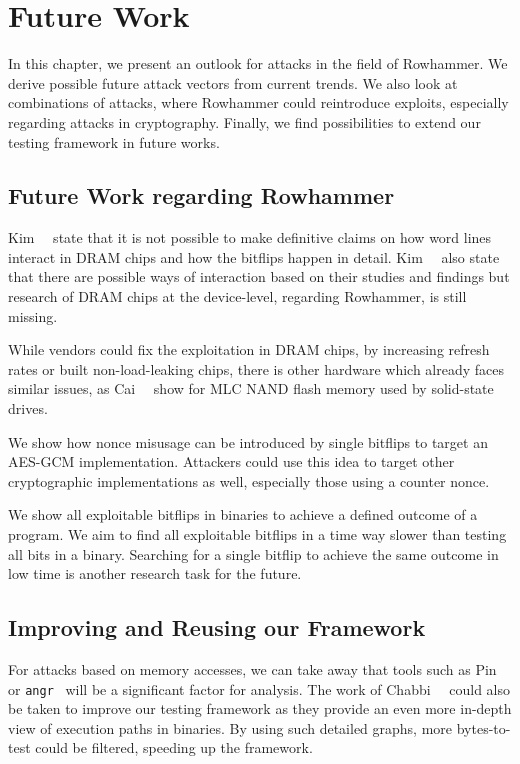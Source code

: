 \chapter{Future Work}\label{sec:futurework}

In this chapter, we present an outlook for attacks in the field of Rowhammer. We
derive possible future attack vectors from current trends. We also look at
combinations of attacks, where Rowhammer could reintroduce exploits, especially
regarding attacks in cryptography. Finally, we find possibilities to extend our
testing framework in future works.

\section{Future Work regarding Rowhammer}

Kim~\etal~\cite{rowhammergeneral} state that it is not possible to make
definitive claims on how word lines interact in DRAM chips and how the bitflips
happen in detail. Kim~\etal~\cite{rowhammergeneral} also state that there are
possible ways of interaction based on their studies and findings but research of
DRAM chips at the device-level, regarding Rowhammer, is still missing.

While vendors could fix the exploitation in DRAM chips, by increasing refresh
rates or built non-load-leaking chips, there is other hardware which already
faces similar issues, as Cai~\etal~\cite{rownandhammer} show for MLC NAND flash
memory used by solid-state drives.

We show how nonce misusage can be introduced by single bitflips to target an
AES-GCM implementation. Attackers could use this idea to target other
cryptographic implementations as well, especially those using a counter nonce.

We show all exploitable bitflips in binaries to achieve a defined outcome of a
program. We aim to find all exploitable bitflips in a time way slower than
testing all bits in a binary. Searching for a single bitflip to achieve the same
outcome in low time is another research task for the future.

\section{Improving and Reusing our Framework}

For attacks based on memory accesses, we can take away that tools such as
Pin~\cite{pintool} or \texttt{angr}~\cite{angrpaper} will be a significant
factor for analysis. The work of Chabbi~\etal~\cite{pincallpaths} could also be
taken to improve our testing framework as they provide an even more in-depth
view of execution paths in binaries. By using such detailed graphs, more
bytes-to-test could be filtered, speeding up the framework.

